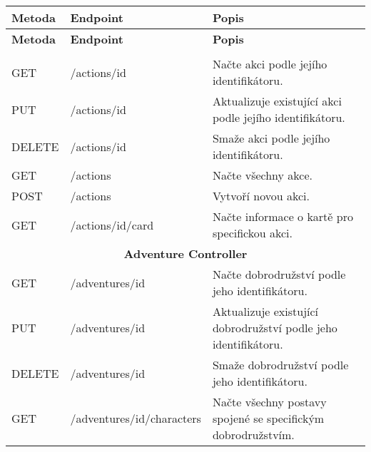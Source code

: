\newpage

\begin{longtable}{|l|l|p{}|}
    \hline
    \textbf{Metoda} & \textbf{Endpoint}           & \textbf{Popis}                                                      \\
    \hline
    \endfirsthead

    \hline
    \textbf{Metoda} & \textbf{Endpoint}           & \textbf{Popis}                                                      \\
    \hline
    \endhead

    \hline
    \endfoot

    \hline
    \endlastfoot

    \multicolumn{3}{|c|}{\textbf{Action Controller}}                                                                    \\
    \hline
    GET             & /actions/{id}               & Načte akci podle jejího identifikátoru.                             \\
    PUT             & /actions/{id}               & Aktualizuje existující akci podle jejího identifikátoru.            \\
    DELETE          & /actions/{id}               & Smaže akci podle jejího identifikátoru.                             \\
    GET             & /actions                    & Načte všechny akce.                                                 \\
    POST            & /actions                    & Vytvoří novou akci.                                                 \\
    GET             & /actions/{id}/card          & Načte informace o kartě pro specifickou akci.                       \\
    \hline
    \multicolumn{3}{|c|}{\textbf{Adventure Controller}}                                                                 \\
    \hline
    GET             & /adventures/{id}            & Načte dobrodružství podle jeho identifikátoru.                      \\
    PUT             & /adventures/{id}            & Aktualizuje existující dobrodružství podle jeho identifikátoru.     \\
    DELETE          & /adventures/{id}            & Smaže dobrodružství podle jeho identifikátoru.                      \\
    GET             & /adventures/{id}/characters & Načte všechny postavy spojené se specifickým dobrodružstvím.        \\

\end{longtable}
